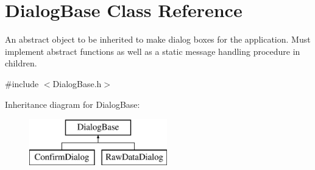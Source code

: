 \hypertarget{class_dialog_base}{
\section{DialogBase Class Reference}
\label{class_dialog_base}
}


An abstract object to be inherited to make dialog boxes for the application. Must implement abstract functions as well as a static message handling procedure in children.  




{\ttfamily \#include $<$DialogBase.h$>$}

Inheritance diagram for DialogBase:\begin{figure}[H]
\begin{center}
\leavevmode
\includegraphics[height=2.000000cm]{class_dialog_base}
\end{center}
\end{figure}
